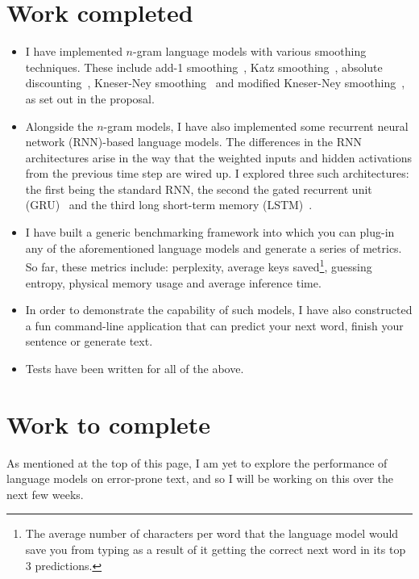 \documentclass[a4paper, 12pt]{article}
\begin{document}
\section*{Work completed}

\begin{itemize}
\item
	I have implemented $n$-gram language models with various smoothing techniques. These include add-1 smoothing~\cite{add1_smoothing:johnson1932}, Katz smoothing~\cite{katz_smoothing:katz1987}, absolute discounting~\cite{absolute_discounting:ney1994}, Kneser-Ney smoothing~\cite{kneser_ney_smoothing:kneser1995} and modified Kneser-Ney smoothing~\cite{modified_kneser_ney:chen1999}, as set out in the proposal.
	
\item
	Alongside the $n$-gram models, I have also implemented some recurrent neural network (RNN)-based language models. The differences in the RNN architectures arise in the way that the weighted inputs and hidden activations from the previous time step are wired up. I explored three such architectures: the first being the standard RNN\cite{rnn_lm:mikolov2010}, the second the gated recurrent unit (GRU)~\cite{gru:cho2014} and the third long short-term memory (LSTM)~\cite{lstm:hochreiter1997}.

\item
	I have built a generic benchmarking framework into which you can plug-in any of the aforementioned language models and generate a series of metrics. So far, these metrics include: perplexity, average keys saved\footnote{The average number of characters per word that the language model would save you from typing as a result of it getting the correct next word in its top 3 predictions.}, guessing entropy, physical memory usage and average inference time.

\item
	In order to demonstrate the capability of such models, I have also constructed a fun command-line application that can predict your next word, finish your sentence or generate text.
	
\item
	Tests have been written for all of the above.
\end{itemize}

\section*{Work to complete}

As mentioned at the top of this page, I am yet to explore the performance of language models on error-prone text, and so I will be working on this over the next few weeks. \\
\end{document}

